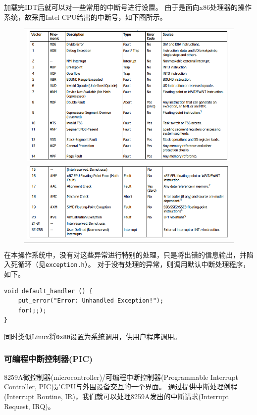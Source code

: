 \documentclass[logo,reportComp]{thesis}
\begin{document}
加载完IDT后就可以对一些常用的中断号进行设置。
由于是面向x86处理器的操作系统，故采用Intel CPU给出的中断号，如下图所示。
\begin{figure}[H]
\centering
\begin{tabular}{c}
\includegraphics[width=0.8\linewidth]{fig/exceptions1.PNG}\\
\includegraphics[width=0.8\linewidth]{fig/exceptions2.PNG}
\end{tabular}
\end{figure}

在本操作系统中，没有对这些异常进行特别的处理，只是将出错的信息输出，并陷入死循环（见\verb'exception.h'）。
对于没有处理的异常，则调用默认中断处理程序，如下。
\begin{lstlisting}
void default_handler () {
	put_error("Error: Unhandled Exception!");
	for(;;);
}
\end{lstlisting}

同时类似Linux将\verb'0x80'设置为系统调用，供用户程序调用。

\subsubsection{可编程中断控制器(PIC)}
8259A微控制器(microcontroller)/可编程中断控制器(Programmable Interrupt Controller, PIC)是CPU与外围设备交互的一个界面。
通过提供中断处理例程(Interrupt Routine, IR)，我们就可以处理8259A发出的中断请求(Interrupt Request, IRQ)。
\end{document}
